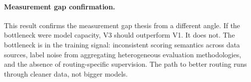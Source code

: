 \paragraph{Measurement gap confirmation.} This result confirms the measurement gap thesis from a different angle. If the bottleneck were model capacity, V3 should outperform V1. It does not. The bottleneck is in the training signal: inconsistent scoring semantics across data sources, label noise from aggregating heterogeneous evaluation methodologies, and the absence of routing-specific supervision. The path to better routing runs through cleaner data, not bigger models.
